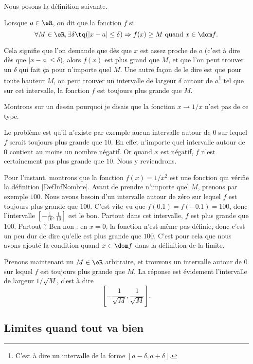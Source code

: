 Nous posons la définition suivante.
\begin{definition}      \label{DefInfNombre}
Lorsque $a\in\eR$, on dit que la fonction $f$  si
\[ 
  \forall M\in\eR,\exists \delta\tq (| x-a |\leq \delta )\Rightarrow f(x)\geq M\text{ quand $x\in\dom f$}.
\]
\end{definition}
Cela signifie que l'on demande que dès que $x$ est assez proche de $a$ (c'est à dire dès que $| x-a |\leq\delta$), alors $f(x)$ est plus grand que $M$, et que l'on peut trouver un $\delta$ qui fait ça pour n'importe quel $M$. Une autre façon de le dire est que pour toute hauteur $M$, on peut trouver un intervalle de largeur $\delta$ autour de $a$\footnote{C'est à dire un intervalle de la forme $[a-\delta,a+\delta]$.} tel que sur cet intervalle, la fonction $f$ est toujours plus grande que $M$.

Montrons sur un dessin pourquoi je disais que la fonction $x\to 1/x$ n'est pas de ce type.


Le problème est qu'il n'existe par exemple aucun intervalle autour de $0$ sur lequel $f$ serait toujours plus grande que $10$. En effet n'importe quel intervalle autour de $0$ contient au moins un nombre négatif. Or quand $x$ est négatif, $f$ n'est certainement pas plus grande que $10$. Nous y reviendrons.

Pour l'instant, montrons que la fonction $f(x)=1/x^2$ est une fonction qui vérifie la définition \ref{DefInfNombre}.  Avant de prendre n'importe quel $M$, prenons par exemple $100$. Nous avons besoin d'un intervalle autour de zéro sur lequel $f$ est toujours plus grande que $100$. C'est vite vu que $f(0.1)=f(-0.1)=100$, donc l'intervalle $[-\frac{ 1 }{ 10 },\frac{1}{ 10 }]$ est le bon. Partout dans cet intervalle, $f$ est plus grande que $100$. Partout ? Ben non : en $x=0$, la fonction n'est même pas définie, donc c'est un peu dur de dire qu'elle est plus grande que $100$. C'est pour cela que nous avons ajouté la condition \og quand $x\in\dom f$\fg{} dans la définition de la limite.

Prenons maintenant un $M\in\eR$ arbitraire, et trouvons un intervalle autour de $0$ sur lequel $f$ est toujours plus grande que $M$. La réponse est évidement l'intervalle de largeur $1/\sqrt{M}$, c'est à dire 
\[ 
  \left[ -\frac{ 1 }{ \sqrt{M} },\frac{ 1 }{ \sqrt{M} } \right].
\]

\subsection{Limites quand tout va bien}

